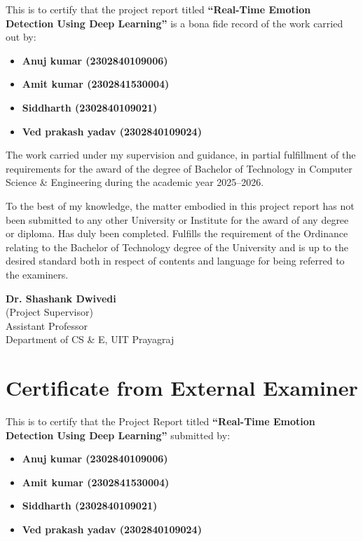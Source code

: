 \documentclass[12pt,a4paper]{report}
\begin{document}
This is to certify that the project report titled \textbf{“Real-Time Emotion Detection Using Deep Learning”} is a bona fide record of the work carried out by:

\begin{itemize}[label={}]
    \item \textbf{Anuj kumar (2302840109006)}
    \item \textbf{Amit kumar (2302841530004)}
    \item \textbf{Siddharth (2302840109021)}
    \item \textbf{Ved prakash yadav (2302840109024)}
\end{itemize}

The work carried under my supervision and guidance, in partial fulfillment of the requirements for the award of the degree of Bachelor of Technology in Computer Science \& Engineering during the academic year 2025–2026.

To the best of my knowledge, the matter embodied in this project report has not been submitted to any other University or Institute for the award of any degree or diploma. Has duly been completed. Fulfills the requirement of the Ordinance relating to the Bachelor of Technology degree of the University and is up to the desired standard both in respect of contents and language for being referred to the examiners.

\vspace{3cm}
\noindent \textbf{Dr. Shashank Dwivedi} \\
(Project Supervisor) \\
Assistant Professor \\
Department of CS \& E, UIT Prayagraj

\clearpage

\chapter*{\centering Certificate from External Examiner}
\vspace{1cm}

This is to certify that the Project Report titled \textbf{“Real-Time Emotion Detection Using Deep Learning”} submitted by:

\begin{itemize}[label={}]
    \item \textbf{Anuj kumar (2302840109006)}
    \item \textbf{Amit kumar (2302841530004)}
    \item \textbf{Siddharth (2302840109021)}
    \item \textbf{Ved prakash yadav (2302840109024)}
\end{itemize}
\end{document}
